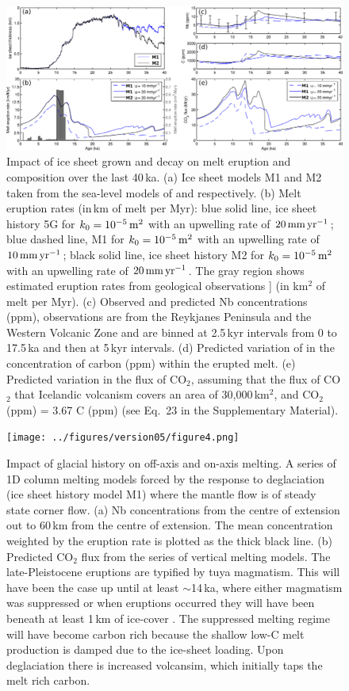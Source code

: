 \documentclass[draft,linenumbers]{agujournal2018}
\begin{document}
\begin{figure}
\includegraphics[width=14cm]{../figures/version05/figure3.png}
\caption{Impact of ice sheet grown and decay on melt eruption and composition over the last 40\,ka. (a) Ice sheet models M1 and M2 taken from the sea-level models of \citet{peltier-2004} and \citet{pico-etal-2017} respectively. (b) Melt eruption rates (in\,km of melt per Myr): blue solid line, ice sheet history 5G for $k_{0} = 10^{-5}\rm\,m^{2}$ with an upwelling rate of $20\rm\,mm\,yr^{-1}$; blue dashed line, M1 for $k_{0} = 10^{-5}\rm\,m^{2}$ with an upwelling rate of $10\rm\,mm\,yr^{-1}$; black solid line, ice sheet history M2 for $k_{0} = 10^{-5}\rm\,m^{2}$ with an upwelling rate of $20\rm\,mm\,yr^{-1}$. The gray region shows estimated eruption rates from geological observations \citep{maclennan-etal-2002}] (in km$^2$ of melt per Myr). (c) Observed and predicted Nb concentrations (ppm), observations are from the Reykjanes Peninsula and the Western Volcanic Zone \citep{gee-etal-1998,sinton-etal-2005,eason-etal-2015} and are binned at 2.5\,kyr intervals from 0 to 17.5\,ka and then at 5\,kyr intervals. (d) Predicted variation of in the concentration of carbon (ppm) within the erupted melt. (e) Predicted variation in the flux of CO$_{2}$, assuming that the flux of CO$_{2}$ that Icelandic volcanism covers an area of 30,000\,km$^{2}$, and CO$_{2}$ (ppm) = 3.67 C (ppm) (see Eq.~23 in the Supplementary Material).}
\label{fg:5}
\end{figure}

\begin{figure}
\texttt{[image: ../figures/version05/figure4.png]}
\caption{Impact of glacial history on off-axis and on-axis melting. A series of 1D column melting models forced by the response to deglaciation (ice sheet history model M1) where the mantle flow is of steady state corner flow. (a) Nb concentrations from the centre of extension out to 60\,km from the centre of extension. The mean concentration weighted by the eruption rate is plotted as the thick black line. (b) Predicted CO$_{2}$ flux from the series of vertical melting models. The late-Pleistocene eruptions are typified by tuya magmatism. This will have been the case up until at least $\sim$14\,ka, where either magmatism was suppressed or when eruptions occurred they will have been beneath at least 1\,km of ice-cover \citep{hartley-etal-2016}. The suppressed melting regime will have become carbon rich because the shallow low-C melt production is damped due to the ice-sheet loading. Upon deglaciation there is increased volcansim, which initially taps the melt rich carbon.}
\label{fg:6}
\end{figure}
\end{document}
